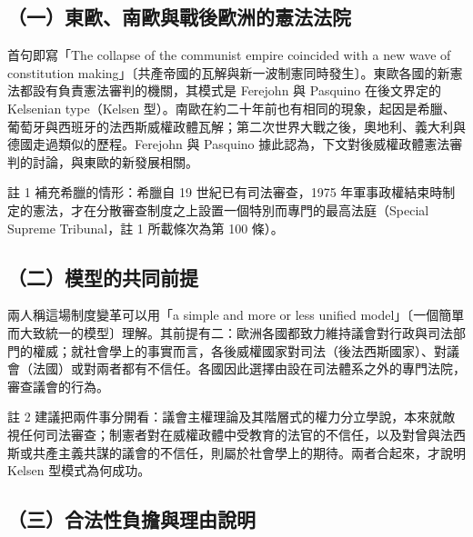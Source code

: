 \subsection{（一）東歐、南歐與戰後歐洲的憲法法院}

首句即寫「The collapse of the communist empire coincided with a new wave of constitution making」〔共產帝國的瓦解與新一波制憲同時發生〕。東歐各國的新憲法都設有負責憲法審判的機關，其模式是 Ferejohn 與 Pasquino 在後文界定的 Kelsenian type（Kelsen 型）。南歐在約二十年前也有相同的現象，起因是希臘、葡萄牙與西班牙的法西斯威權政體瓦解；第二次世界大戰之後，奧地利、義大利與德國走過類似的歷程。Ferejohn 與 Pasquino 據此認為，下文對後威權政體憲法審判的討論，與東歐的新發展相關。

註 1 補充希臘的情形：希臘自 19 世紀已有司法審查，1975 年軍事政權結束時制定的憲法，才在分散審查制度之上設置一個特別而專門的最高法庭（Special Supreme Tribunal，註 1 所載條次為第 100 條）。

\subsection{（二）模型的共同前提}

兩人稱這場制度變革可以用「a simple and more or less unified model」〔一個簡單而大致統一的模型〕理解。其前提有二：歐洲各國都致力維持議會對行政與司法部門的權威；就社會學上的事實而言，各後威權國家對司法（後法西斯國家）、對議會（法國）或對兩者都有不信任。各國因此選擇由設在司法體系之外的專門法院，審查議會的行為。

註 2 建議把兩件事分開看：議會主權理論及其階層式的權力分立學說，本來就敵視任何司法審查；制憲者對在威權政體中受教育的法官的不信任，以及對曾與法西斯或共產主義共謀的議會的不信任，則屬於社會學上的期待。兩者合起來，才說明 Kelsen 型模式為何成功。

\subsection{（三）合法性負擔與理由說明}

